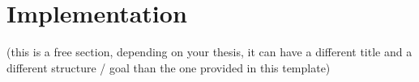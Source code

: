 \section{Implementation}
\label{sec::implementation}

(this is a free section, depending on your thesis, it can have a different title and a different structure / goal than the one provided in this template)